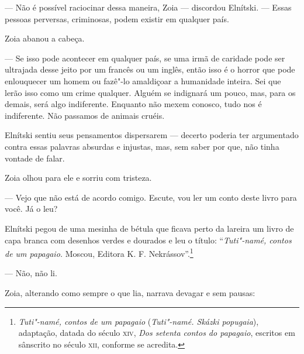 --- Não é possível raciocinar dessa maneira, Zoia --- discordou
Elnítski. --- Essas pessoas perversas, criminosas, podem existir em
qualquer país.

Zoia abanou a cabeça.

--- Se isso pode acontecer em qualquer país, se uma irmã de caridade
pode ser ultrajada desse jeito por um francês ou um inglês, então isso é
o horror que pode enlouquecer um homem ou fazê"-lo amaldiçoar a
humanidade inteira. Sei que lerão isso como um crime qualquer. Alguém se
indignará um pouco, mas, para os demais, será algo indiferente. Enquanto
não mexem conosco, tudo nos é indiferente. Não passamos de animais
cruéis.

Elnítski sentiu seus pensamentos dispersarem --- decerto poderia ter
argumentado contra essas palavras absurdas e injustas, mas, sem saber
por que, não tinha vontade de falar.

Zoia olhou para ele e sorriu com tristeza.

--- Vejo que não está de acordo comigo. Escute, vou ler um conto deste
livro para você. Já o leu?

Elnítski pegou de uma mesinha de bétula que ficava perto da lareira um
livro de capa branca com desenhos verdes e dourados e leu o título:
``\emph{Tuti"-namé, contos de um papagaio.} Moscou, Editora K. F.
Nekrássov''.\footnote{\emph{Tuti"-namé, contos de um
  papagaio} (\emph{Tuti"-namé. Skázki popugaia}), adaptação, datada do
  século \textsc{xiv}, \emph{Dos setenta contos do papagaio}, escritos em sânscrito no
  século \textsc{xii}, conforme se acredita.}

--- Não, não li.

Zoia, alterando como sempre o que lia, narrava devagar e sem pausas:

